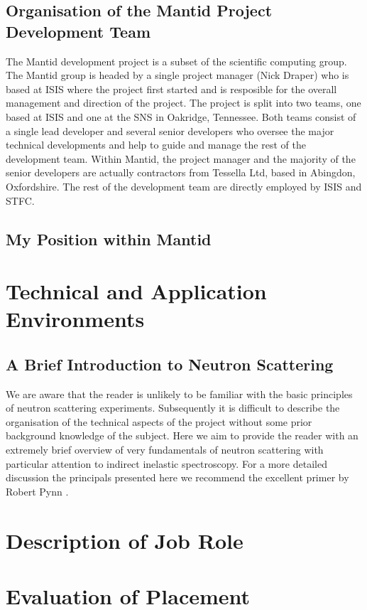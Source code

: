 \documentclass[paper=a4, fontsize=11pt]{scrartcl}	%
\numberwithin{equation}{section}															%
\numberwithin{figure}{section}																%
\numberwithin{table}{section}																%
\begin{document}
\subsection{Organisation of the Mantid Project Development Team}
The Mantid development project is a subset of the scientific computing group. The Mantid group is headed by a single project manager (Nick Draper) who is based at ISIS where the project first started and is resposible for the overall management and direction of the project. The project is split into two teams, one based at ISIS and one at the SNS in Oakridge, Tennessee. Both teams consist of a single lead developer and several senior developers who oversee the major technical developments and help to guide and manage the rest of the development team. Within Mantid, the project manager and the majority of the senior developers are actually contractors from Tessella Ltd, based in Abingdon, Oxfordshire. The rest of the development team are directly employed by ISIS and STFC.

\subsection{My Position within Mantid}

\section{Technical and Application Environments}
\subsection{A Brief Introduction to Neutron Scattering}
We are aware that the reader is unlikely to be familiar with the basic principles of neutron scattering experiments. Subsequently it is difficult to describe the organisation of the technical aspects of the project without some prior background knowledge of the subject. Here we aim to provide the reader with an extremely brief overview of very fundamentals of neutron scattering  with particular attention to indirect inelastic spectroscopy. For a more detailed discussion the principals presented here we recommend the excellent primer by Robert Pynn \cite{rpynn2008}.

\section{Description of Job Role}
\section{Evaluation of Placement}


\end{document}
